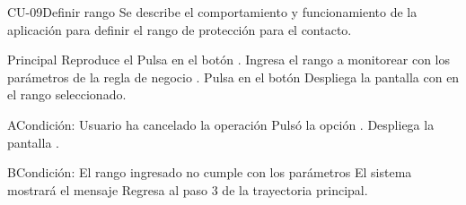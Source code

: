 \begin{UseCase}{CU-09}{Definir rango}{
	Se describe el comportamiento y funcionamiento de la aplicación para definir el rango de protección para el contacto.}
	\end{UseCase}
	\begin{UCtrayectoria}{Principal}
		\UCpaso[\UCsist] Reproduce el 
		\UCpaso[\UCactor] Pulsa en el botón .
		\UCpaso[\UCactor] Ingresa el rango a monitorear con los parámetros de la regla de negocio . 
		\UCpaso[\UCactor] Pulsa en el botón  
		\UCpaso[\UCsist] Despliega la pantalla  con en el rango seleccionado. 
	\end{UCtrayectoria}
	\begin{UCtrayectoriaA}{A}{Condición: Usuario ha cancelado la operación}
		\UCpaso[\UCactor] Pulsó la opción .
		\UCpaso[\UCsist] Despliega la pantalla .
	\end{UCtrayectoriaA}

	\begin{UCtrayectoriaA}{B}{Condición: El rango ingresado no cumple con los parámetros}
		\UCpaso[\UCsist] El sistema mostrará el mensaje 
		\UCpaso[\UCsist] Regresa al paso 3 de la trayectoria principal. 
	\end{UCtrayectoriaA}
